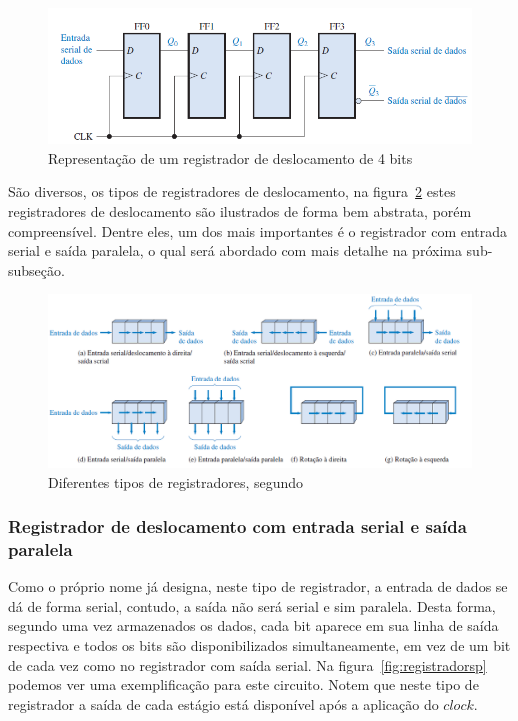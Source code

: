 \documentclass[12pt]{article}
\begin{document}
\begin{figure}[h]
\centering
\includegraphics[width=.7\textwidth]{img/Fig5RegistradorDeslocamento.png}
\caption{Representação de um registrador de deslocamento de 4 bits \cite{floyd2011digital}}
\label{fig:rdeslocamento}
\end{figure}


São diversos, os tipos de registradores de deslocamento, na figura~\ref{fig:registradores} estes registradores de deslocamento são ilustrados de forma bem abstrata, porém compreensível. Dentre eles, um dos mais importantes é o registrador com entrada serial e saída paralela, o qual será abordado com mais detalhe na próxima sub-subseção.

\begin{figure}[h]
\centering
\includegraphics[width=.8\textwidth]{img/Fig6tipodeRegistrador.png}
\caption{Diferentes tipos de registradores, segundo \cite{floyd2011digital}}
\label{fig:registradores}
\end{figure}

\subsubsection{Registrador de deslocamento com entrada serial e saída paralela}

Como o próprio nome já designa, neste tipo de registrador, a entrada de dados se dá de forma serial, contudo, a saída não será serial e sim paralela. Desta forma, segundo \cite{floyd2011digital} uma vez armazenados os dados, cada bit aparece em sua linha de saída respectiva e todos os bits são disponibilizados simultaneamente, em vez de um bit de cada vez como no registrador com saída serial. Na figura~\ref{fig:registradorsp} podemos ver uma exemplificação para este circuito. Notem que neste tipo de registrador a saída de cada estágio está disponível após a aplicação do $clock$.
\end{document}
